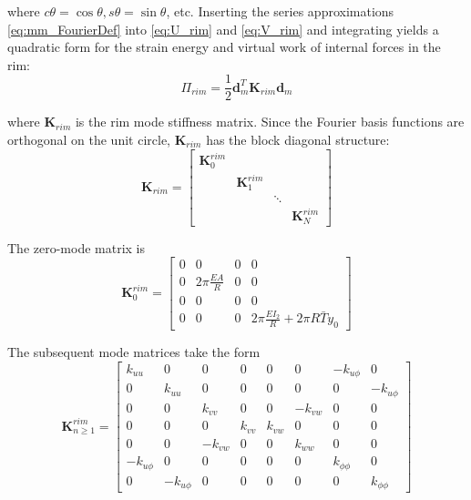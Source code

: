\documentclass[\rootdir/thesis.tex]{subfiles}
\begin{document}
where $c\theta=\cos{\theta}, s\theta=\sin{\theta}$, etc. Inserting the series approximations \eqref{eq:mm_FourierDef} into \eqref{eq:U_rim} and \eqref{eq:V_rim} and integrating yields a quadratic form for the strain energy and virtual work of internal forces in the rim:
\begin{equation}
\label{eq:mm_U_rim}
\Pi_{rim} = \frac{1}{2} \mathbf{d}_m^T \mathbf{K}_{rim} \mathbf{d}_m
\end{equation}

where $\mathbf{K}_{rim}$ is the rim mode stiffness matrix. Since the Fourier basis functions are orthogonal on the unit circle, $\mathbf{K}_{rim}$ has the block diagonal structure:
\begin{equation}
\label{eq:mm_K_rim}
\mathbf{K}_{rim} =
\begin{bmatrix}
\mathbf{K}_0^{rim} & & &\\
& \mathbf{K}_1^{rim} & &\\
& & \ddots &\\
& & & \mathbf{K}_N^{rim}
\end{bmatrix}
\end{equation}

The zero-mode matrix is
\begin{equation}
\mathbf{K}_0^{rim} =
\begin{bmatrix}
0 & 0 & 0 & 0\\
0 & 2\pi \frac{EA}{R} & 0 & 0\\
0 & 0 & 0 & 0\\
0 & 0 & 0 & 2\pi \frac{EI_2}{R} + 2\pi R\bar{T}y_0
\end{bmatrix}
\end{equation}

The subsequent mode matrices take the form
\begin{equation}
\mathbf{K}_{n\geq 1}^{rim} =
\begin{bmatrix}
k_{uu} & 0 & 0 & 0 & 0 & 0 & -k_{u\phi} & 0\\
0 & k_{uu} & 0 & 0 & 0 & 0 & 0 & -k_{u\phi}\\
0 & 0 & k_{vv} & 0 & 0 & -k_{vw} & 0 & 0\\
0 & 0 & 0 & k_{vv} & k_{vw} & 0 & 0 & 0\\
0 & 0 & -k_{vw} & 0 & 0 & k_{ww} & 0 & 0\\
-k_{u\phi} & 0 & 0 & 0 & 0 & 0 & k_{\phi\phi} & 0\\
0 & -k_{u\phi} & 0 & 0 & 0 & 0 & 0 & k_{\phi\phi}
\end{bmatrix}
\end{equation}
\end{document}
